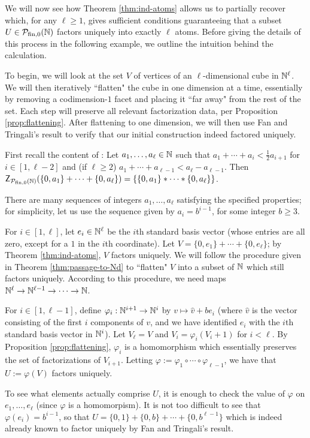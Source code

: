 We will now see how Theorem \ref{thm:ind-atoms} allows us to partially recover \cite[Proposition 4.9]{fan-tringali18} which, for any $\ell\ge 1$, gives sufficient conditions guaranteeing that a subset $U\in {\mathcal{P}_{\textrm{fin},0}(\mathbb{N})}$ factors uniquely into exactly $\ell$ atoms.  
Before giving the details of this process in the following example, we outline the intuition behind the calculation.

To begin, we will look at the set $V$ of vertices of an $\ell$-dimensional cube in $\mathbb{N}^\ell$.
We will then iteratively ``flatten" the cube in one dimension at a time, essentially by removing a codimension-$1$ facet and placing it ``far away" from the rest of the set.  
Each step will preserve all relevant factorization data, per Proposition \ref{prop:flattening}.
After flattening to one dimension, we will then use Fan and Tringali's result to verify that our initial construction indeed factored uniquely.  

\begin{eg} \label{eg:recover-flat-unique-fac}
	First recall the content of \cite[Proposition 4.9]{fan-tringali18}: Let $a_1,\dots, a_\ell \in \mathbb{N}$ such that $a_1 + \cdots + a_i < \frac{1}{2} a_{i+1}$ for $i\in [ 1,\ell-2 ]$ and (if $\ell \ge 2$) $a_1+\cdots + a_{\ell-1} < a_\ell - a_{\ell-1}$.
	Then $\mathsf{Z}_{{\mathcal{P}_{\textrm{fin},0}(\mathbb{N})}}(\{0,a_1\}+\cdots+\{0,a_\ell\}) = \{ \{0,a_1\}*\cdots*\{0,a_\ell\}\}$.
	
	There are many sequences of integers $a_1,\dots,a_\ell$ satisfying the specified properties; for simplicity, let us use the sequence given by $a_i = b^{i-1}$, for some integer $b \ge 3$.
	
	For $i\in [ 1,\ell ]$, let $e_i \in \mathbb{N}^\ell$ be the $i$th standard basis vector (whose entries are all zero, except for a $1$ in the $i$th coordinate).
	Let $V = \{0,e_1\} + \cdots + \{0,e_\ell\}$; by Theorem \ref{thm:ind-atoms}, $V$ factors uniquely.
	We will follow the procedure given in Theorem \ref{thm:passage-to-Nd} to ``flatten" $V$ into a subset of $\mathbb{N}$ which still factors uniquely.
	According to this procedure, we need maps $\mathbb{N}^\ell \to \mathbb{N}^{\ell-1} \to \dots \to \mathbb{N}$.
	
	For $i\in [ 1,\ell-1 ]$, define $\varphi_i: \mathbb{N}^{i+1} \to \mathbb{N}^{i}$ by $v \mapsto \hat{v} + be_{i}$ (where $\hat{v}$ is the vector consisting of the first $i$ components of $v$, and we have identified $e_i$ with the $i$th standard basis vector in $\mathbb{N}^i$).
	Let $V_\ell = V$ and $V_i = \varphi_i(V_i+1)$ for $i <\ell$.
	By Proposition \ref{prop:flattening}, $\varphi_i$ is a homomorphism which essentially preserves the set of factorizations of $V_{i+1}$.
	Letting $\varphi := \varphi_1\circ \cdots \circ \varphi_{\ell-1}$, we have that $U := \varphi(V)$ factors uniquely.
	
	To see what elements actually comprise $U$, it is enough to check the value of $\varphi$ on $e_1,\dots, e_\ell$ (since $\varphi$ is a homomorpism).
	It is not too difficult to see that $\varphi(e_i) = b^{i-1}$, so that $U = \{0,1\}+\{0,b\}+\cdots+\{0,b^{\ell-1}\}$ which is indeed already known to factor uniquely by Fan and Tringali's result.
\end{eg}




